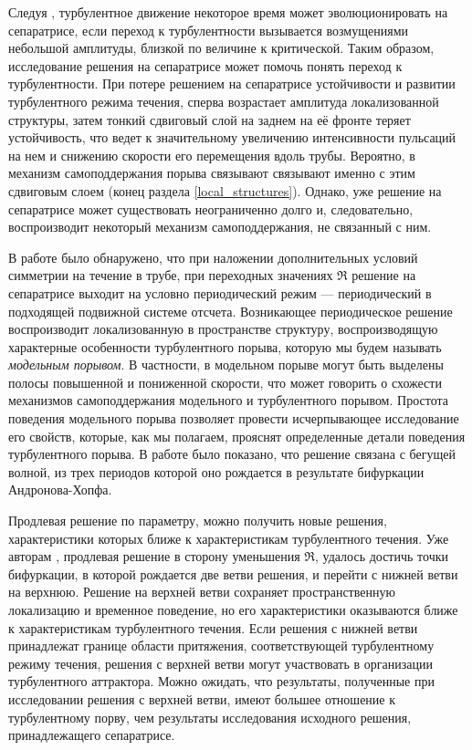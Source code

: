 Следуя \cite{Duguet2010}, турбулентное движение некоторое время может эволюционировать на сепаратрисе, если переход к турбулентности вызывается возмущениями небольшой амплитуды, близкой по величине к критической. Таким образом, исследование решения на сепаратрисе может помочь понять переход к турбулентности. При потере решением на сепаратрисе устойчивости и развитии турбулентного режима течения, сперва возрастает амплитуда локализованной структуры, затем тонкий сдвиговый слой на заднем на её фронте теряет устойчивость, что ведет к значительному увеличению интенсивности пульсаций на нем и снижению скорости его перемещения вдоль трубы. Вероятно, в \cite{Shimizu2009, Hof2010} механизм самоподдержания порыва связывают связывают именно с этим сдвиговым слоем (конец раздела \ref{local_structures}). Однако, уже решение на сепаратрисе может существовать неограниченно долго и, следовательно, воспроизводит некоторый механизм самоподдержания, не связанный с ним. 

В работе \cite{Avila2013} было обнаружено, что при наложении дополнительных условий симметрии на течение в трубе, при переходных значениях $\Re$ решение на сепаратрисе выходит на условно периодический режим --- периодический в подходящей подвижной системе отсчета. Возникающее периодическое решение воспроизводит локализованную в пространстве структуру, воспроизводящую характерные особенности турбулентного порыва, которую мы будем называть {\it модельным порывом}. В частности, в модельном порыве могут быть выделены полосы повышенной и пониженной скорости, что может говорить о схожести механизмов самоподдержания модельного и турбулентного порывом. Простота поведения модельного порыва позволяет провести исчерпывающее исследование его свойств, которые, как мы полагаем, прояснят определенные детали поведения турбулентного порыва. В работе \cite{Chantry2014} было показано, что решение \cite{Avila2013} связана с бегущей волной, из трех периодов которой оно рождается в результате бифуркации Андронова-Хопфа. 

Продлевая решение \cite{Avila2013} по параметру, можно получить новые решения, характеристики которых ближе к характеристикам турбулентного течения. Уже авторам \cite{Avila2013}, продлевая решение в сторону уменьшения $\Re$, удалось достичь точки бифуркации, в которой рождается две ветви решения, и перейти с нижней ветви на верхнюю. Решение на верхней ветви сохраняет пространственную локализацию и временное поведение, но его характеристики оказываются ближе к характеристикам турбулентного течения. Если решения с нижней ветви принадлежат границе области притяжения, соответствующей турбулентному режиму течения, решения с верхней ветви могут участвовать в организации турбулентного аттрактора. Можно ожидать, что результаты, полученные при исследовании решения с верхней ветви, имеют большее отношение к турбулентному порву, чем результаты исследования исходного решения, принадлежащего сепаратрисе. 


